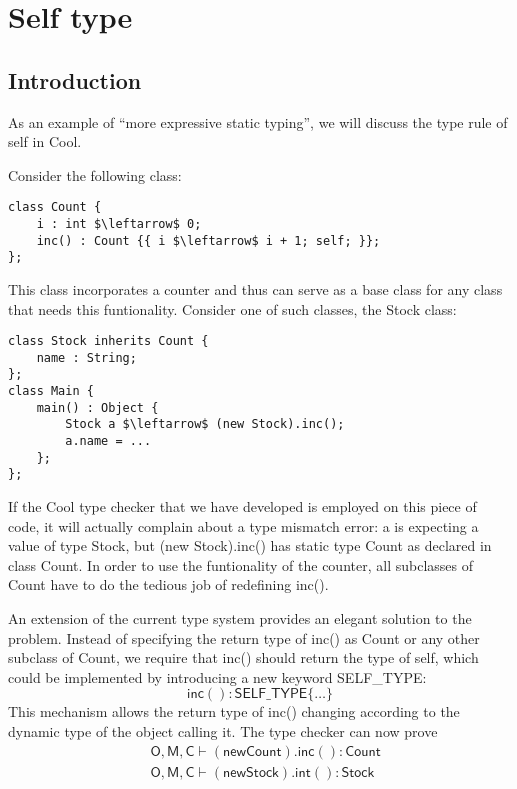 \section{Self type}
\subsection{Introduction}
As an example of ``more expressive static typing'', we will discuss the type rule of self in Cool.

Consider the following class:
\begin{lstlisting}[mathescape = true]
class Count {
	i : int $\leftarrow$ 0;
	inc() : Count {{ i $\leftarrow$ i + 1; self; }};
};
\end{lstlisting}
This class incorporates a counter and thus can serve as a base class for any class that needs this funtionality. Consider one of such classes, the Stock class:
\begin{lstlisting}[mathescape = true]
class Stock inherits Count {
	name : String;
};
class Main {
	main() : Object {
		Stock a $\leftarrow$ (new Stock).inc();
		a.name = ...
	};
};
\end{lstlisting}

If the Cool type checker that we have developed is employed on this piece of code, it will actually complain about a type mismatch error: a is expecting a value of type Stock, but (new Stock).inc() has static type Count as declared in class Count. In order to use the funtionality of the counter, all subclasses of Count have to do the tedious job of redefining inc(). 

An extension of the current type system provides an elegant solution to the problem. Instead of specifying the return type of inc() as Count or any other subclass of Count, we require that inc() should return the type of self, which could be implemented by introducing a new keyword SELF\_TYPE:
\begin{equation*}
\mathsf{inc() : SELF\_TYPE \{\dots\}}
\end{equation*}
This mechanism allows the return type of inc() changing according to the dynamic type of the object calling it. The type checker can now prove
\begin{equation*}
\begin{split}
&\mathsf{O,M,C\vdash(new Count).inc() : Count}\\
&\mathsf{O,M,C\vdash(new Stock).int() : Stock}\\
\end{split}
\end{equation*}
